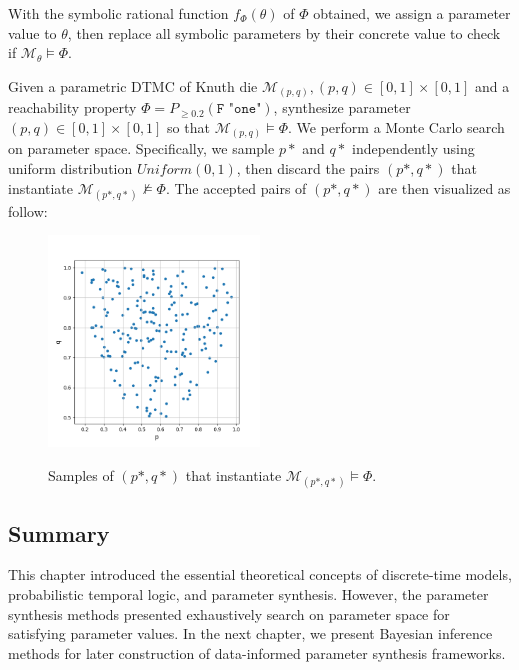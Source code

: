 With the symbolic rational function $f_\Phi(\theta)$ of $\Phi$ obtained, we assign a parameter value
to $\theta$, then replace all symbolic parameters by their concrete value to check if
$\mathcal{M}_\theta \models \Phi$.
\begin{example}
      Given a parametric DTMC of Knuth die $\mathcal{M}_{(p,q)}, (p,q)\in[0,1]\times[0,1]$ and a
      reachability property $\Phi = P_{\geq 0.2} (\texttt{F "one"})$, synthesize parameter
      $(p,q)\in[0,1]\times[0,1]$ so that $\mathcal{M}_{(p,q)} \models \Phi$. We perform a Monte
      Carlo search on parameter space. Specifically, we sample $p*$ and $q*$ independently using
      uniform distribution $Uniform(0,1)$, then discard the pairs $(p*,q*)$ that instantiate
      $\mathcal{M}_{(p*,q*)}\nvDash \Phi$. The accepted pairs of $(p*,q*)$ are then visualized as
      follow:
      \begin{figure}[H]
            \centering
            \includegraphics[width=0.5\textwidth]{figures/knuth_die_trueparams.png}
            \label{fig:knuth-die-pq-trueparams}
            \caption{Samples of $(p*,q*)$ that instantiate $\mathcal{M}_{(p*,q*)} \models \Phi$.}
      \end{figure}
\end{example}

\subsection{Summary}
This chapter introduced the essential theoretical concepts of discrete-time models, probabilistic
temporal logic, and parameter synthesis. However, the parameter synthesis methods presented
exhaustively search on parameter space for satisfying parameter values. In the next chapter, we
present Bayesian inference methods for later construction of data-informed parameter synthesis
frameworks.